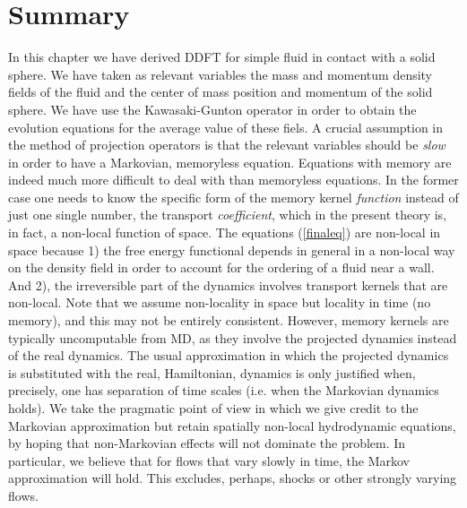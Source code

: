 \documentclass[b5paper,openright,11pt]{book}
\begin{document}
\section{Summary}
In this chapter we have derived DDFT for simple fluid in contact with a solid sphere. We have taken as relevant variables the mass and momentum density fields of the fluid and the center of mass position and momentum of the solid sphere. We have use the Kawasaki-Gunton operator in order to obtain the evolution equations for the average value of these fiels.  
A crucial assumption in the method of projection operators is that the
relevant variables should be {\em slow}  in order to have a Markovian,
memoryless  equation.   Equations with  memory  are  indeed much  more
difficult to deal with than  memoryless equations.  In the former case
one  needs  to know  the  specific  form  of  the memory  kernel  {\em
  function}  instead of  just one  single number,  the transport  {\em
  coefficient}, which in  the present theory is, in  fact, a non-local
function  of space.   The equations  (\ref{finaleq}) are  non-local in
space because  1) the free energy  functional depends in general  in a
non-local  way on  the  density  field in  order  to  account for  the
ordering of a fluid near a wall.  And 2), the irreversible part of the
dynamics involves transport kernels that  are non-local.  Note that we
assume non-locality  in space  but locality in  time (no  memory), and
this  may not  be entirely  consistent.  However,  memory kernels  are
typically uncomputable from MD, as they involve the projected dynamics
instead of  the real  dynamics. The usual  approximation in  which the
projected dynamics is substituted with the real, Hamiltonian, dynamics
is only justified  when, precisely, one has separation  of time scales
(i.e.   when the  Markovian dynamics  holds).  We  take the  pragmatic
point of view  in which we give credit to  the Markovian approximation
but retain spatially non-local  hydrodynamic equations, by hoping that
non-Markovian effects will not dominate the problem. In particular, we
believe  that  for  flows  that   vary  slowly  in  time,  the  Markov
approximation  will hold.   This  excludes, perhaps,  shocks or  other
strongly varying flows.
\end{document}
